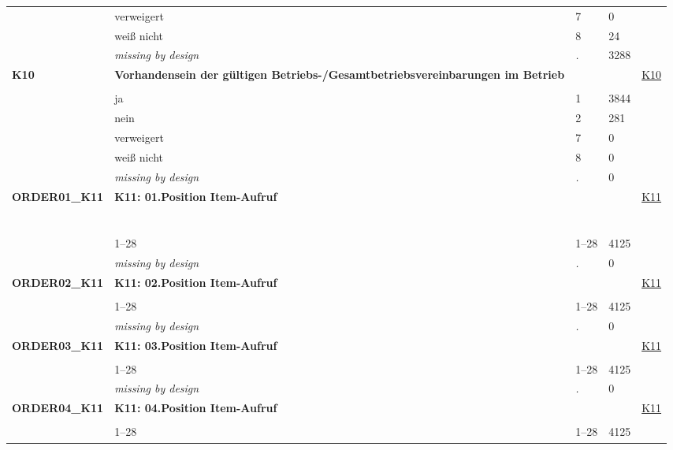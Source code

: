 \begin{longtable}{| L{2.65cm} | L{8cm} | C{1.5cm} | R{1.25cm} | C{2.25cm}  |}
   & verweigert & 7 & 0 &  \\ 
   & weiß nicht & 8 & 24 &  \\ 
   & \textit{missing by design} & \textit{.} & 3288 &  \\ 
   \midrule
\textbf{K10}\label{var:K10} & \textbf{Vorhandensein der gültigen Betriebs-/Gesamtbetriebsvereinbarungen im Betrieb} &  &  & \hyperref[K10]{K10} \\ 
   &  &  &  &  \\ 
   & ja & 1 & 3844 &  \\ 
   & nein & 2 & 281 &  \\ 
   & verweigert & 7 & 0 &  \\ 
   & weiß nicht & 8 & 0 &  \\ 
   & \textit{missing by design} & \textit{.} & 0 &  \\ 
   \midrule
\textbf{ORDER01\_K11}\label{var:ORDER01:K11} & \textbf{K11: 01.Position Item-Aufruf} &  &  & \hyperref[K11]{K11} \\ 
   & \protect\subsection[Variablen ORDER01\_K11 bis K12c]{} &  &  &  \\ 
   & 1--28 & 1--28 & 4125 &  \\ 
   & \textit{missing by design} & \textit{.} & 0 &  \\ 
   \midrule
\textbf{ORDER02\_K11}\label{var:ORDER02:K11} & \textbf{K11: 02.Position Item-Aufruf} &  &  & \hyperref[K11]{K11} \\ 
   &  &  &  &  \\ 
   & 1--28 & 1--28 & 4125 &  \\ 
   & \textit{missing by design} & \textit{.} & 0 &  \\ 
   \midrule
\textbf{ORDER03\_K11}\label{var:ORDER03:K11} & \textbf{K11: 03.Position Item-Aufruf} &  &  & \hyperref[K11]{K11} \\ 
   &  &  &  &  \\ 
   & 1--28 & 1--28 & 4125 &  \\ 
   & \textit{missing by design} & \textit{.} & 0 &  \\ 
   \midrule
\textbf{ORDER04\_K11}\label{var:ORDER04:K11} & \textbf{K11: 04.Position Item-Aufruf} &  &  & \hyperref[K11]{K11} \\ 
   &  &  &  &  \\ 
   & 1--28 & 1--28 & 4125 &  \\ 

\end{longtable}
